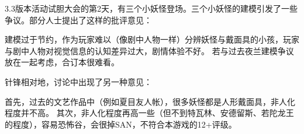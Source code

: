 \clearpage
\dividearticles

\begin{multicols}{2}
	3.3版本活动试胆大会的第2天，有三个小妖怪登场。三个小妖怪的建模引发了一些争议。部分人士提出了这样的批评意见：

	建模过于节约，作为玩家难以（像剧中人物一样）分辨妖怪与戴面具的小孩，玩家与剧中人物对视觉信息的认知差异过大，剧情体验不好。
	若与过去夜兰建模争议放在一起考虑，合订本很难看。

	针锋相对地，讨论中出现了另一种意见：

	首先，过去的文艺作品中（例如夏目友人帐），很多妖怪都是人形戴面具，非人化程度并不高。
	其次，非人化程度再高一些（但不到特瓦林、安德留斯、若陀龙王的程度），容易恐怖谷，会很掉SAN，不符合本游戏的12+评级。


\end{multicols}










